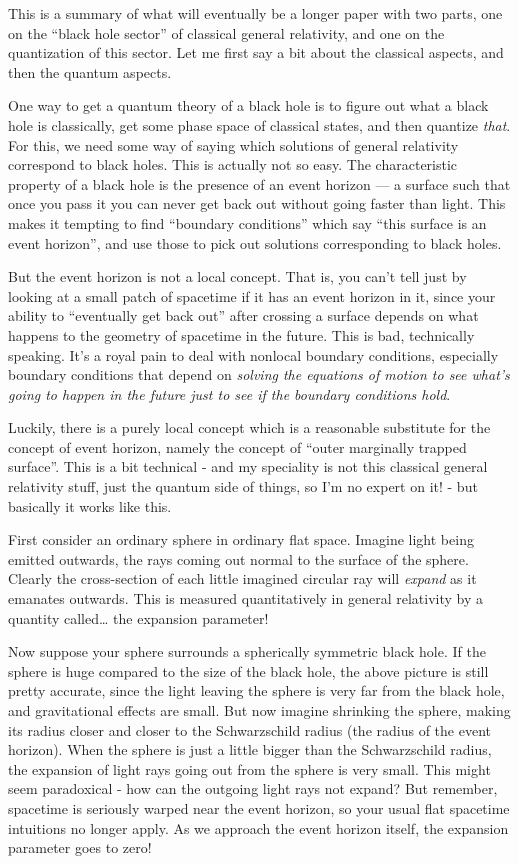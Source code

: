 \documentclass{article}
\begin{document}
This is a summary of what will eventually be a longer paper with two
parts, one on the ``black hole sector'' of classical general relativity,
and one on the quantization of this sector. Let me first say a bit about
the classical aspects, and then the quantum aspects.

One way to get a quantum theory of a black hole is to figure out what a
black hole is classically, get some phase space of classical states, and
then quantize \emph{that}. For this, we need some way of saying which
solutions of general relativity correspond to black holes. This is
actually not so easy. The characteristic property of a black hole is the
presence of an event horizon --- a surface such that once you pass it
you can never get back out without going faster than light. This makes
it tempting to find ``boundary conditions'' which say ``this surface is
an event horizon'', and use those to pick out solutions corresponding to
black holes.

But the event horizon is not a local concept. That is, you can't tell
just by looking at a small patch of spacetime if it has an event horizon
in it, since your ability to ``eventually get back out'' after crossing
a surface depends on what happens to the geometry of spacetime in the
future. This is bad, technically speaking. It's a royal pain to deal
with nonlocal boundary conditions, especially boundary conditions that
depend on \emph{solving the equations of motion to see what's going to
happen in the future just to see if the boundary conditions hold}.

Luckily, there is a purely local concept which is a reasonable
substitute for the concept of event horizon, namely the concept of
``outer marginally trapped surface''. This is a bit technical - and my
speciality is not this classical general relativity stuff, just the
quantum side of things, so I'm no expert on it! - but basically it works
like this.

First consider an ordinary sphere in ordinary flat space. Imagine light
being emitted outwards, the rays coming out normal to the surface of the
sphere. Clearly the cross-section of each little imagined circular ray
will \emph{expand} as it emanates outwards. This is measured
quantitatively in general relativity by a quantity called\ldots{} the
expansion parameter!

Now suppose your sphere surrounds a spherically symmetric black hole. If
the sphere is huge compared to the size of the black hole, the above
picture is still pretty accurate, since the light leaving the sphere is
very far from the black hole, and gravitational effects are small. But
now imagine shrinking the sphere, making its radius closer and closer to
the Schwarzschild radius (the radius of the event horizon). When the
sphere is just a little bigger than the Schwarzschild radius, the
expansion of light rays going out from the sphere is very small. This
might seem paradoxical - how can the outgoing light rays not expand? But
remember, spacetime is seriously warped near the event horizon, so your
usual flat spacetime intuitions no longer apply. As we approach the
event horizon itself, the expansion parameter goes to zero!
\end{document}
